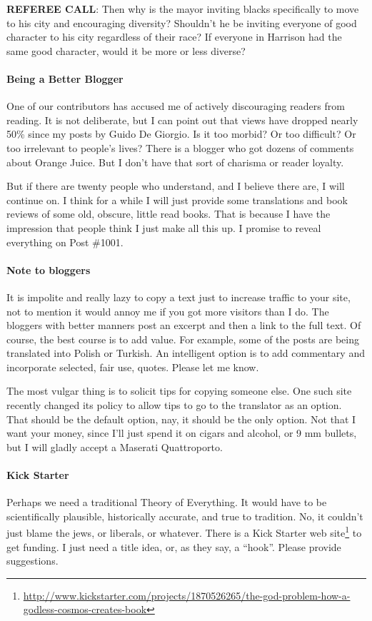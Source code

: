 \textbf{REFEREE CALL}: Then why is the mayor inviting blacks specifically to move to his city and encouraging diversity? Shouldn't he be inviting everyone of good character to his city regardless of their race? If everyone in Harrison had the same good character, would it be more or less diverse?

\paragraph{Being a Better Blogger}


One of our contributors has accused me of actively discouraging readers from reading. It is not deliberate, but I can point out that views have dropped nearly 50\% since my posts by Guido De Giorgio. Is it too morbid? Or too difficult? Or too irrelevant to people's lives? There is a blogger who got dozens of comments about Orange Juice. But I don't have that sort of charisma or reader loyalty.

But if there are twenty people who understand, and I believe there are, I will continue on. I think for a while I will just provide some translations and book reviews of some old, obscure, little read books. That is because I have the impression that people think I just make all this up. I promise to reveal everything on Post \#1001.

\paragraph{Note to bloggers}


It is impolite and really lazy to copy a text just to increase traffic to your site, not to mention it would annoy me if you got more visitors than I do. The bloggers with better manners post an excerpt and then a link to the full text. Of course, the best course is to add value. For example, some of the posts are being translated into Polish or Turkish. An intelligent option is to add commentary and incorporate selected, fair use, quotes. Please let me know.

The most vulgar thing is to solicit tips for copying someone else. One such site recently changed its policy to allow tips to go to the translator as an option. That should be the default option, nay, it should be the only option. Not that I want your money, since I'll just spend it on cigars and alcohol, or 9 mm bullets, but I will gladly accept a Maserati Quattroporto.

\paragraph{Kick Starter}


Perhaps we need a traditional Theory of Everything. It would have to be scientifically plausible, historically accurate, and true to tradition. No, it couldn't just blame the jews, or liberals, or whatever. There is a Kick Starter web site\footnote{\url{http://www.kickstarter.com/projects/1870526265/the-god-problem-how-a-godless-cosmos-creates-book}} to get funding. I just need a title idea, or, as they say, a ``hook''. Please provide suggestions.




